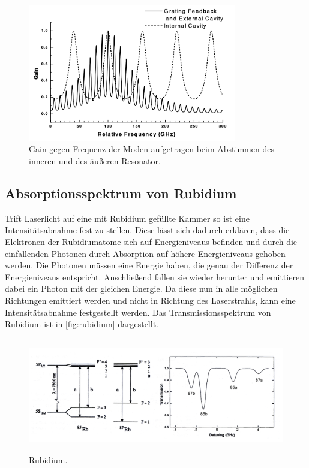 \begin{figure}[H]
    \centering
    \includegraphics[height=6cm]{content/pics/moden.png}
    \caption{Gain gegen Frequenz der Moden aufgetragen beim Abstimmen des inneren und des äußeren Resonator. 
    \cite{V60}}
    \label{fig:mode}
\end{figure}

\subsection{Absorptionsspektrum von Rubidium}
Trift Laserlicht auf eine mit Rubidium gefüllte Kammer so ist eine Intensitätsabnahme fest zu stellen. Diese lässt
sich dadurch erklären, dass die Elektronen der Rubidiumatome sich auf Energieniveaus befinden und durch die
einfallenden Photonen durch Absorption auf höhere Energieniveaus gehoben werden.
Die Photonen müssen eine Energie haben, die genau der Differenz der Energieniveaus entspricht. Anschließend fallen
sie wieder herunter und emittieren dabei ein Photon mit der gleichen Energie. Da diese nun in alle möglichen
Richtungen emittiert werden und nicht in Richtung des Laserstrahls, kann eine Intensitätsabnahme festgestellt werden.
Das Transmissionsspektrum von Rubidium ist in \autoref{fig:rubidium} dargestellt.

\begin{figure}[H]
    \centering
    \includegraphics[height=5cm]{content/pics/Rubidium.png}
    \caption{Rubidium. \cite{V60}}
    \label{fig:rubidium}
\end{figure}

